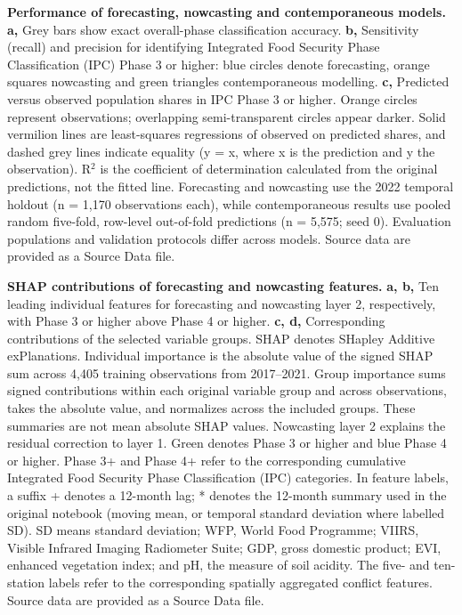 
\caption{\textbf{Performance of forecasting, nowcasting and contemporaneous models.} \textbf{a,} Grey bars show exact overall-phase classification accuracy. \textbf{b,} Sensitivity (recall) and precision for identifying Integrated Food Security Phase Classification (IPC) Phase 3 or higher: blue circles denote forecasting, orange squares nowcasting and green triangles contemporaneous modelling. \textbf{c,} Predicted versus observed population shares in IPC Phase 3 or higher. Orange circles represent observations; overlapping semi-transparent circles appear darker. Solid vermilion lines are least-squares regressions of observed on predicted shares, and dashed grey lines indicate equality (y = x, where x is the prediction and y the observation). R$^2$ is the coefficient of determination calculated from the original predictions, not the fitted line. Forecasting and nowcasting use the 2022 temporal holdout (n = 1,170 observations each), while contemporaneous results use pooled random five-fold, row-level out-of-fold predictions (n = 5,575; seed 0). Evaluation populations and validation protocols differ across models. Source data are provided as a Source Data file.}

\caption{\textbf{SHAP contributions of forecasting and nowcasting features.} \textbf{a, b,} Ten leading individual features for forecasting and nowcasting layer 2, respectively, with Phase 3 or higher above Phase 4 or higher. \textbf{c, d,} Corresponding contributions of the selected variable groups. SHAP denotes SHapley Additive exPlanations. Individual importance is the absolute value of the signed SHAP sum across 4,405 training observations from 2017–2021. Group importance sums signed contributions within each original variable group and across observations, takes the absolute value, and normalizes across the included groups. These summaries are not mean absolute SHAP values. Nowcasting layer 2 explains the residual correction to layer 1. Green denotes Phase 3 or higher and blue Phase 4 or higher. Phase 3+ and Phase 4+ refer to the corresponding cumulative Integrated Food Security Phase Classification (IPC) categories. In feature labels, a suffix + denotes a 12-month lag; * denotes the 12-month summary used in the original notebook (moving mean, or temporal standard deviation where labelled SD). SD means standard deviation; WFP, World Food Programme; VIIRS, Visible Infrared Imaging Radiometer Suite; GDP, gross domestic product; EVI, enhanced vegetation index; and pH, the measure of soil acidity. The five- and ten-station labels refer to the corresponding spatially aggregated conflict features. Source data are provided as a Source Data file.}

